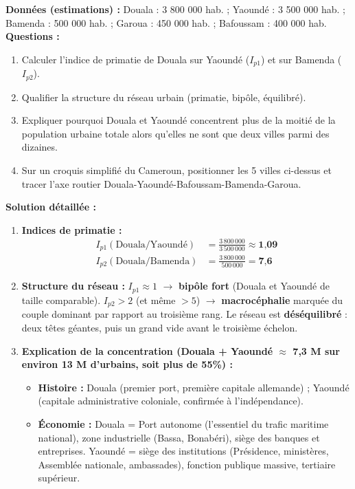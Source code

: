 \documentclass[11pt]{article}
\begin{document}
\begin{exoresolu}
\textbf{Données (estimations) :} Douala : 3 800 000 hab. ; Yaoundé : 3 500 000 hab. ; Bamenda : 500 000 hab. ; Garoua : 450 000 hab. ; Bafoussam : 400 000 hab.
\textbf{Questions :}
\begin{enumerate}
    \item Calculer l'indice de primatie de Douala sur Yaoundé ($I_{p1}$) et sur Bamenda ($I_{p2}$).
    \item Qualifier la structure du réseau urbain (primatie, bipôle, équilibré).
    \item Expliquer pourquoi Douala et Yaoundé concentrent plus de la moitié de la population urbaine totale alors qu'elles ne sont que deux villes parmi des dizaines.
    \item Sur un croquis simplifié du Cameroun, positionner les 5 villes ci-dessus et tracer l'axe routier Douala-Yaoundé-Bafoussam-Bamenda-Garoua.
\end{enumerate}
\tcblower
\textbf{Solution détaillée :}
\begin{enumerate}
    \item \textbf{Indices de primatie :}
    \begin{align*}
        I_{p1} (\text{Douala/Yaoundé}) &= \frac{3\,800\,000}{3\,500\,000} \approx \textbf{1,09} \\
        I_{p2} (\text{Douala/Bamenda}) &= \frac{3\,800\,000}{500\,000} = \textbf{7,6}
    \end{align*}
    \item \textbf{Structure du réseau :}
    $I_{p1} \approx 1$ $\rightarrow$ \textbf{bipôle fort} (Douala et Yaoundé de taille comparable).
    $I_{p2} > 2$ (et même $> 5$) $\rightarrow$ \textbf{macrocéphalie} marquée du couple dominant par rapport au troisième rang. Le réseau est \textbf{déséquilibré} : deux \og têtes \fg{} géantes, puis un grand vide avant le troisième échelon.
    \item \textbf{Explication de la concentration (Douala + Yaoundé $\approx$ 7,3 M sur environ 13 M d'urbains, soit plus de 55\%) :}
    \begin{itemize}
        \item \textbf{Histoire :} Douala (premier port, première capitale allemande) ; Yaoundé (capitale administrative coloniale, confirmée à l'indépendance).
        \item \textbf{Économie :} Douala = Port autonome (l'essentiel du trafic maritime national), zone industrielle (Bassa, Bonabéri), siège des banques et entreprises. Yaoundé = siège des institutions (Présidence, ministères, Assemblée nationale, ambassades), fonction publique massive, tertiaire supérieur.

\end{itemize}
\end{enumerate}
\end{exoresolu}
\end{document}
